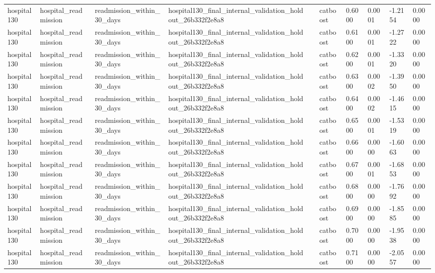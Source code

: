 \begin{tabular}{llllllllll}
hospital130 & hospital\_readmission & readmission\_within\_30\_days & hospital130\_final\_internal\_validation\_holdout\_26b332f2e8a8 &  & catboost & 0.6000 & 0.0001 & -1.2154 & 0.0000 \\
hospital130 & hospital\_readmission & readmission\_within\_30\_days & hospital130\_final\_internal\_validation\_holdout\_26b332f2e8a8 &  & catboost & 0.6100 & 0.0001 & -1.2722 & 0.0000 \\
hospital130 & hospital\_readmission & readmission\_within\_30\_days & hospital130\_final\_internal\_validation\_holdout\_26b332f2e8a8 &  & catboost & 0.6200 & 0.0001 & -1.3320 & 0.0000 \\
hospital130 & hospital\_readmission & readmission\_within\_30\_days & hospital130\_final\_internal\_validation\_holdout\_26b332f2e8a8 &  & catboost & 0.6300 & 0.0002 & -1.3950 & 0.0000 \\
hospital130 & hospital\_readmission & readmission\_within\_30\_days & hospital130\_final\_internal\_validation\_holdout\_26b332f2e8a8 &  & catboost & 0.6400 & 0.0002 & -1.4615 & 0.0000 \\
hospital130 & hospital\_readmission & readmission\_within\_30\_days & hospital130\_final\_internal\_validation\_holdout\_26b332f2e8a8 &  & catboost & 0.6500 & 0.0001 & -1.5319 & 0.0000 \\
hospital130 & hospital\_readmission & readmission\_within\_30\_days & hospital130\_final\_internal\_validation\_holdout\_26b332f2e8a8 &  & catboost & 0.6600 & 0.0000 & -1.6063 & 0.0000 \\
hospital130 & hospital\_readmission & readmission\_within\_30\_days & hospital130\_final\_internal\_validation\_holdout\_26b332f2e8a8 &  & catboost & 0.6700 & 0.0001 & -1.6853 & 0.0000 \\
hospital130 & hospital\_readmission & readmission\_within\_30\_days & hospital130\_final\_internal\_validation\_holdout\_26b332f2e8a8 &  & catboost & 0.6800 & 0.0000 & -1.7692 & 0.0000 \\
hospital130 & hospital\_readmission & readmission\_within\_30\_days & hospital130\_final\_internal\_validation\_holdout\_26b332f2e8a8 &  & catboost & 0.6900 & 0.0000 & -1.8585 & 0.0000 \\
hospital130 & hospital\_readmission & readmission\_within\_30\_days & hospital130\_final\_internal\_validation\_holdout\_26b332f2e8a8 &  & catboost & 0.7000 & 0.0000 & -1.9538 & 0.0000 \\
hospital130 & hospital\_readmission & readmission\_within\_30\_days & hospital130\_final\_internal\_validation\_holdout\_26b332f2e8a8 &  & catboost & 0.7100 & 0.0000 & -2.0557 & 0.0000 \\

\end{tabular}
